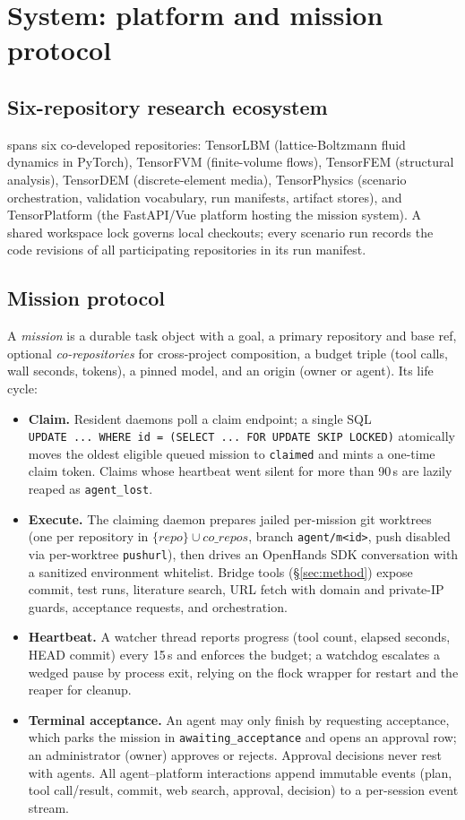 \section{System: platform and mission protocol}\label{sec:system}

\subsection{Six-repository research ecosystem}
\sysname{} spans six co-developed repositories: TensorLBM
(lattice-Boltzmann fluid dynamics in PyTorch), TensorFVM (finite-volume
flows), TensorFEM (structural analysis), TensorDEM (discrete-element
media), TensorPhysics (scenario orchestration, validation vocabulary,
run manifests, artifact stores), and TensorPlatform (the FastAPI/Vue
platform hosting the mission system). A shared workspace lock governs
local checkouts; every scenario run records the code revisions of all
participating repositories in its run manifest.

\subsection{Mission protocol}
A \emph{mission} is a durable task object with a goal, a primary
repository and base ref, optional \emph{co-repositories} for
cross-project composition, a budget triple (tool calls, wall seconds,
tokens), a pinned model, and an origin (owner or agent). Its life cycle:

\begin{itemize}
\item \textbf{Claim.} Resident daemons poll a claim endpoint; a single
SQL \texttt{UPDATE\ ...\ WHERE id = (SELECT ... FOR UPDATE SKIP
LOCKED)} atomically moves the oldest eligible queued mission to
\texttt{claimed} and mints a one-time claim token. Claims whose
heartbeat went silent for more than 90\,s are lazily reaped as
\texttt{agent\_lost}.
\item \textbf{Execute.} The claiming daemon prepares jailed per-mission
git worktrees (one per repository in $\{repo\} \cup co\_repos$, branch
\texttt{agent/m<id>}, push disabled via per-worktree \texttt{pushurl}),
then drives an OpenHands SDK conversation with a sanitized environment
whitelist. Bridge tools (\S\ref{sec:method}) expose commit, test runs,
literature search, URL fetch with domain and private-IP guards,
acceptance requests, and orchestration.
\item \textbf{Heartbeat.} A watcher thread reports progress (tool count,
elapsed seconds, HEAD commit) every 15\,s and enforces the budget; a
watchdog escalates a wedged pause by process exit, relying on the flock
wrapper for restart and the reaper for cleanup.
\item \textbf{Terminal acceptance.} An agent may only finish by
requesting acceptance, which parks the mission in
\texttt{awaiting\_acceptance} and opens an approval row; an administrator
(owner) approves or rejects. Approval decisions never rest with agents.
All agent--platform interactions append immutable events (plan, tool
call/result, commit, web search, approval, decision) to a per-session
event stream.
\end{itemize}

